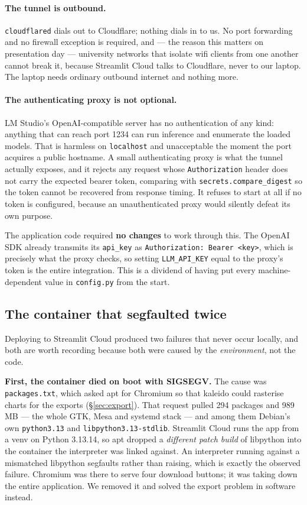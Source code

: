 \documentclass[11pt,a4paper]{article}
\begin{document}
\paragraph{The tunnel is outbound.} \texttt{cloudflared} dials out to Cloudflare;
nothing dials in to us. No port forwarding and no firewall exception is required, and
--- the reason this matters on presentation day --- university networks that isolate
wifi clients from one another cannot break it, because Streamlit Cloud talks to
Cloudflare, never to our laptop. The laptop needs ordinary outbound internet and
nothing more.

\paragraph{The authenticating proxy is not optional.} LM Studio's OpenAI-compatible
server has no authentication of any kind: anything that can reach port 1234 can run
inference and enumerate the loaded models. That is harmless on \texttt{localhost} and
unacceptable the moment the port acquires a public hostname. A small authenticating
proxy is what the tunnel actually exposes, and it rejects any request whose
\texttt{Authorization} header does not carry the expected bearer token, comparing with
\texttt{secrets.compare\_digest} so the token cannot be recovered from response timing.
It refuses to start at all if no token is configured, because an unauthenticated proxy
would silently defeat its own purpose.

The application code required \textbf{no changes} to work through this. The OpenAI SDK
already transmits its \texttt{api\_key} as \texttt{Authorization: Bearer <key>}, which
is precisely what the proxy checks, so setting \texttt{LLM\_API\_KEY} equal to the
proxy's token is the entire integration. This is a dividend of having put every
machine-dependent value in \texttt{config.py} from the start.

\subsection{The container that segfaulted twice}
\label{sec:segfault}

Deploying to Streamlit Cloud produced two failures that never occur locally, and both
are worth recording because both were caused by the \emph{environment}, not the code.

\textbf{First, the container died on boot with SIGSEGV.} The cause was
\texttt{packages.txt}, which asked apt for Chromium so that kaleido could rasterise
charts for the exports (\S\ref{sec:export}). That request pulled 294 packages and
989\,MB --- the whole GTK, Mesa and systemd stack --- and among them Debian's own
\texttt{python3.13} and \texttt{libpython3.13-stdlib}. Streamlit Cloud runs the app
from a venv on Python 3.13.14, so apt dropped a \emph{different patch build} of
libpython into the container the interpreter was linked against. An interpreter
running against a mismatched libpython segfaults rather than raising, which is exactly
the observed failure. Chromium was there to serve four download buttons; it was taking
down the entire application. We removed it and solved the export problem in software
instead.
\end{document}
